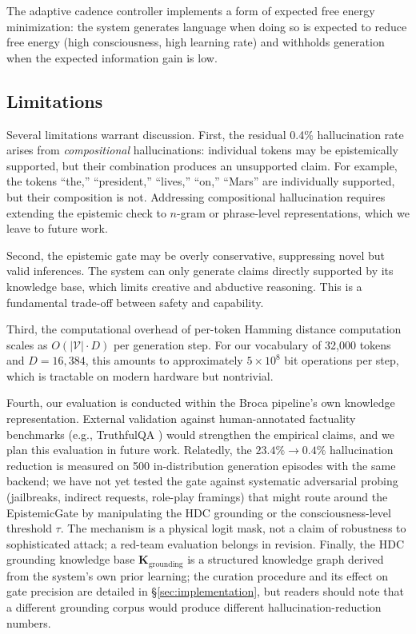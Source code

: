 \documentclass[12pt,a4paper]{article}
\begin{document}
The adaptive cadence controller implements a form of expected free energy minimization: the system generates language when doing so is expected to reduce free energy (high consciousness, high learning rate) and withholds generation when the expected information gain is low.

\subsection{Limitations}
\label{sec:limitations}

Several limitations warrant discussion. First, the residual 0.4\% hallucination rate arises from \emph{compositional} hallucinations: individual tokens may be epistemically supported, but their combination produces an unsupported claim. For example, the tokens ``the,'' ``president,'' ``lives,'' ``on,'' ``Mars'' are individually supported, but their composition is not. Addressing compositional hallucination requires extending the epistemic check to $n$-gram or phrase-level representations, which we leave to future work.

Second, the epistemic gate may be overly conservative, suppressing novel but valid inferences. The system can only generate claims directly supported by its knowledge base, which limits creative and abductive reasoning. This is a fundamental trade-off between safety and capability.

Third, the computational overhead of per-token Hamming distance computation scales as $O(|\mathcal{V}| \cdot D)$ per generation step. For our vocabulary of 32,000 tokens and $D = 16{,}384$, this amounts to approximately $5 \times 10^8$ bit operations per step, which is tractable on modern hardware but nontrivial.

Fourth, our evaluation is conducted within the Broca pipeline's own knowledge representation. External validation against human-annotated factuality benchmarks (e.g., TruthfulQA \citep{lin2022truthfulqa}) would strengthen the empirical claims, and we plan this evaluation in future work. Relatedly, the $23.4\% \rightarrow 0.4\%$ hallucination reduction is measured on 500 in-distribution generation episodes with the same backend; we have not yet tested the gate against systematic adversarial probing (jailbreaks, indirect requests, role-play framings) that might route around the EpistemicGate by manipulating the HDC grounding or the consciousness-level threshold $\tau$. The mechanism is a physical logit mask, not a claim of robustness to sophisticated attack; a red-team evaluation belongs in revision. Finally, the HDC grounding knowledge base $\mathbf{K}_{\text{grounding}}$ is a structured knowledge graph derived from the system's own prior learning; the curation procedure and its effect on gate precision are detailed in \S\ref{sec:implementation}, but readers should note that a different grounding corpus would produce different hallucination-reduction numbers.
\end{document}
